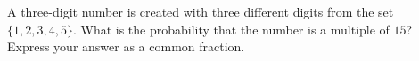 A three-digit number is created with three different digits from the set $\{1,2,3,4,5\}$. What is the probability that the number is a multiple of $15$? Express your answer as a common fraction.
